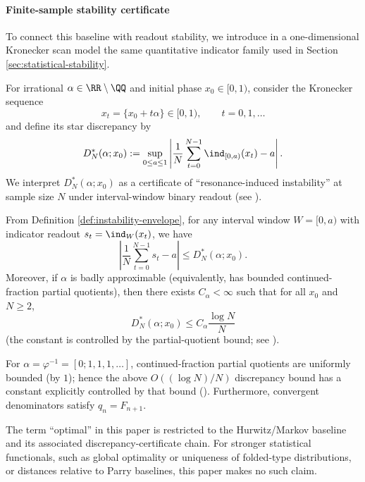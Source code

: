 \paragraph{Finite-sample stability certificate}

To connect this baseline with readout stability, we introduce in a one-dimensional Kronecker scan model the same quantitative indicator family used in Section \ref{sec:statistical-stability}.

\begin{definition}\label{def:instability-envelope}
For irrational \(\alpha\in\RR\setminus\QQ\) and initial phase \(x_0\in[0,1)\), consider the Kronecker sequence
\[
x_t=\{x_0+t\alpha\}\in[0,1),\qquad t=0,1,\dots
\]
and define its star discrepancy by
\[
D_N^*(\alpha;x_0):=\sup_{0\le a\le 1}\left|\frac1N\sum_{t=0}^{N-1}\ind_{[0,a)}(x_t)-a\right|.
\]
We interpret \(D_N^*(\alpha;x_0)\) as a certificate of ``resonance-induced instability'' at sample size \(N\) under interval-window binary readout (see \cite{KuipersNiederreiter1974}).
\end{definition}

From Definition \ref{def:instability-envelope}, for any interval window \(W=[0,a)\) with indicator readout \(s_t=\ind_W(x_t)\), we have
\[
\left|\frac1N\sum_{t=0}^{N-1}s_t-a\right|\le D_N^*(\alpha;x_0).
\]
Moreover, if \(\alpha\) is badly approximable (equivalently, has bounded continued-fraction partial quotients), then there exists \(C_\alpha<\infty\) such that for all \(x_0\) and \(N\ge 2\),
\[
D_N^*(\alpha;x_0)\le C_\alpha\frac{\log N}{N}
\]
(the constant is controlled by the partial-quotient bound; see \cite{KuipersNiederreiter1974}).

\begin{corollary}\label{cor:golden-branch-star-discrepancy-audit}
For \(\alpha=\varphi^{-1}=[0;1,1,1,\dots]\), continued-fraction partial quotients are uniformly bounded (by \(1\)); hence the above \(O((\log N)/N)\) discrepancy bound has a constant explicitly controlled by that bound (\cite{KuipersNiederreiter1974}). Furthermore, convergent denominators satisfy \(q_n=F_{n+1}\).
\end{corollary}

\begin{remark}\label{rem:what-is-optimized}
The term ``optimal'' in this paper is restricted to the Hurwitz/Markov baseline and its associated discrepancy-certificate chain. For stronger statistical functionals, such as global optimality or uniqueness of folded-type distributions, or distances relative to Parry baselines, this paper makes no such claim.
\end{remark}

